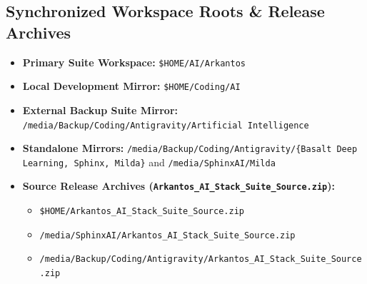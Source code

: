 \documentclass[11pt,a4paper]{article}
\begin{document}
\subsection{Synchronized Workspace Roots \& Release Archives}
\begin{itemize}[leftmargin=1.5em,itemsep=2pt]
  \item \textbf{Primary Suite Workspace:} \nolinkurl{$HOME/AI/Arkantos}
  \item \textbf{Local Development Mirror:} \nolinkurl{$HOME/Coding/AI}
  \item \textbf{External Backup Suite Mirror:} \nolinkurl{/media/Backup/Coding/Antigravity/Artificial Intelligence}
  \item \textbf{Standalone Mirrors:} \nolinkurl{/media/Backup/Coding/Antigravity/{Basalt Deep Learning, Sphinx, Milda}} and \nolinkurl{/media/SphinxAI/Milda}
  \item \textbf{Source Release Archives (\texttt{Arkantos\_AI\_Stack\_Suite\_Source.zip}):}
  \begin{itemize}
    \item \nolinkurl{$HOME/Arkantos_AI_Stack_Suite_Source.zip}
    \item \nolinkurl{/media/SphinxAI/Arkantos_AI_Stack_Suite_Source.zip}
    \item \nolinkurl{/media/Backup/Coding/Antigravity/Arkantos_AI_Stack_Suite_Source.zip}
  \end{itemize}
\end{itemize}
\end{document}

